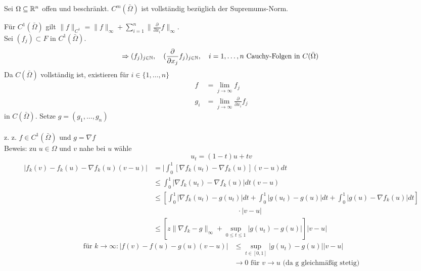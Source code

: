 \begin{beispiel}
	Sei $\Omega \subseteq \mathbb{R}^{n}$ offen und beschränkt. $C^{m}(\bar \Omega)$ ist vollständig bezüglich der Supremums-Norm.	
	\begin{beweis}
		Für $C^{1}(\bar \Omega)$ gilt $\| f \|_{C^{1}} = \| f \|_{\infty} + \sum_{i = 1}^{n}  \| \frac{\partial}{\partial x_{i}} f \|_{\infty}$. \\
		 Sei $(f_{j}) \subset F$ in $C^{1}(\bar \Omega)$.
		 \[ \Rightarrow (f_{j})_{j \in \MdN}, \quad (\frac{\partial}{\partial x_{j}} f_{j})_{j \in \MdN}, \quad i = 1, \dotsc, n \text{ Cauchy-Folgen in } C(\bar \Omega) \]
		 Da $C(\bar \Omega)$ vollständig ist, existieren für $i \in \{ 1, \dotsc, n \} $
		 	\begin{align*}
		 		f & = \lim_{j \rightarrow \infty} f_{j} \\
		 		g_{i} & = \lim_{j \rightarrow \infty} \frac{\partial}{\partial x_{i}} f_{j}
		 	\end{align*}
		 in $C(\bar \Omega)$. Setze $g = (g_{1}, \dotsc, g_{n})$ \\ \\
		 z. z. $f \in C^{1}(\bar \Omega)$ und $g = \nabla f$ \\
		 Beweis: zu $u \in \Omega$ und $v$ nahe bei $u$ wähle
		 \[ u_{t} = (1 - t) u + t v \]
		 \begin{align*}
		 	| f_{k}(v) - f_{k} (u) - \nabla f_{k}(u) (v - u) | & = | \int_{0}^{1} [ \nabla f_{k} (u_{t}) - \nabla f_{k} (u) ] (v - u) dt \\
		 		& \leq  \int_{0}^{1} | \nabla f_{k} (u_{t}) - \nabla f_{k} (u) | dt (v - u) \\
		 		& \leq \left[ \int_{0}^{1} | \nabla f_{k}(u_{t}) - g(u_{t}) | dt + \int_{0}^{1} | g(u_{t}) - g(u) | dt + \int_{0}^{1} | g(u) - \nabla f_{k}(u) | dt \right] \\
		 		&  \hspace{5cm} \cdot |v - u| \\
		 		& \leq \left[ z \| \nabla f_{k} - g \|_{\infty} + \sup_{0 \leq t \leq 1} | g(u_{t}) - g(u) | \right] |v - u|
 		 \end{align*}
 		 \begin{align*}
 		 	\text{für } k \rightarrow \infty: | f(v) - f(u) - g(u)(v - u) | & \leq \sup_{t \in [0, 1]} | g(u_{t}) - g(u) | |v - u| \\
 		 		& \rightarrow 0 \text{ für } v \rightarrow u \text{ (da g gleichmä{\ss}ig stetig)}
 		 \end{align*} 
	\end{beweis}
\end{beispiel}


